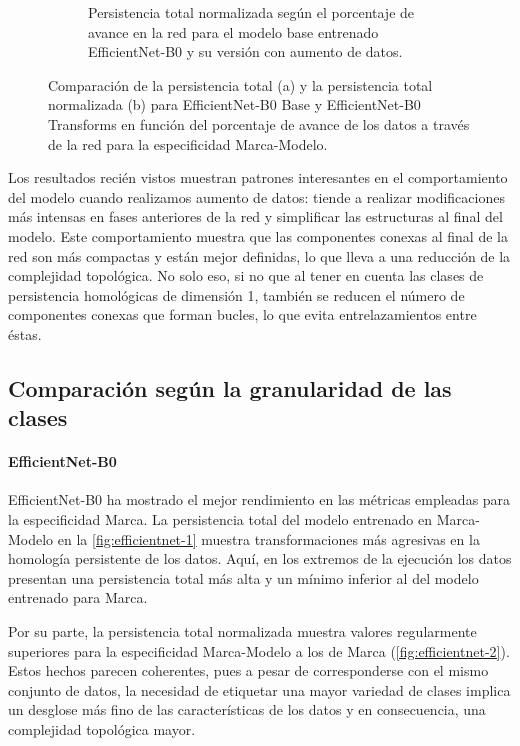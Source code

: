 \begin{figure}[H]
\begin{subfigure}{.5\textwidth}
		\caption{Persistencia total normalizada según el porcentaje de avance en la red para el modelo base entrenado EfficientNet-B0 y su versión con aumento de datos.}
		\label{fig:mm-homology-2}
	\end{subfigure}
	\caption{Comparación de la persistencia total (a) y la persistencia total normalizada (b) para EfficientNet-B0 Base y EfficientNet-B0 Transforms en función del porcentaje de avance de los datos a través de la red para la especificidad Marca-Modelo.}
	\label{fig:mm-homology}
\end{figure}

Los resultados recién vistos muestran patrones interesantes en el comportamiento del modelo cuando realizamos aumento de datos: tiende a realizar modificaciones más intensas en fases anteriores de la red y simplificar las estructuras al final del modelo. Este comportamiento muestra que las componentes conexas al final de la red son más compactas y están mejor definidas, lo que lleva a una reducción de la complejidad topológica. No solo eso, si no que al tener en cuenta las clases de persistencia homológicas de dimensión 1, también se reducen el número de componentes conexas que forman bucles, lo que evita entrelazamientos entre éstas.

\subsection{Comparación según la granularidad de las clases}
\label{subsec:grano}

\paragraph{EfficientNet-B0}

EfficientNet-B0 ha mostrado el mejor rendimiento en las métricas empleadas para la especificidad Marca. La persistencia total del modelo entrenado en Marca-Modelo en la \autoref{fig:efficientnet-1} muestra transformaciones más agresivas en la homología persistente de los datos. Aquí, en los extremos de la ejecución los datos presentan una persistencia total más alta y un mínimo inferior al del modelo entrenado para Marca.

Por su parte, la persistencia total normalizada muestra valores regularmente superiores para la especificidad Marca-Modelo a los de Marca (\autoref{fig:efficientnet-2}). Estos hechos parecen coherentes, pues a pesar de corresponderse con el mismo conjunto de datos, la necesidad de etiquetar una mayor variedad de clases implica un desglose más fino de las características de los datos y en consecuencia, una complejidad topológica mayor.

